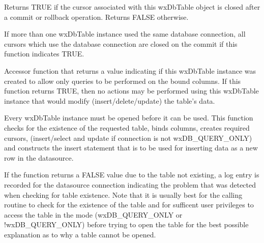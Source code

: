 
Returns TRUE if the cursor associated with this wxDbTable object is closed 
after a commit or rollback operation.  Returns FALSE otherwise.


If more than one wxDbTable instance used the same database connection, all cursors 
which use the database connection are closed on the commit if this function 
indicates TRUE.


\label{wxdbtableisqueryonly}


Accessor function that returns a value indicating if this wxDbTable instance 
was created to allow only queries to be performed on the bound columns.  If 
this function returns TRUE, then no actions may be performed using this 
wxDbTable instance that would modify (insert/delete/update) the table's data.


\label{wxdbtableopen}


Every wxDbTable instance must be opened before it can be used.  This function 
checks for the existence of the requested table, binds columns, creates required 
cursors, (insert/select and update if connection is not wxDB\_QUERY\_ONLY) and 
constructs the insert statement that is to be used for inserting data as a new 
row in the datasource.





If the function returns a FALSE value due to the table not existing, a log 
entry is recorded for the datasource connection indicating the problem 
that was detected when checking for table existence.  Note that it is usually 
best for the calling routine to check for the existence of the table and for 
sufficent user privileges to access the table in the mode (wxDB\_QUERY\_ONLY or 
!wxDB\_QUERY\_ONLY) before trying to open the table for the best possible 
explanation as to why a table cannot be opened.

